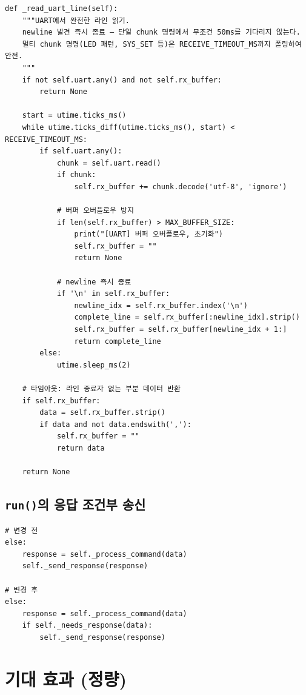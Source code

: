 \documentclass[11pt, oneside]{article}
\begin{document}
\begin{verbatim}
def _read_uart_line(self):
    """UART에서 완전한 라인 읽기.
    newline 발견 즉시 종료 — 단일 chunk 명령에서 무조건 50ms를 기다리지 않는다.
    멀티 chunk 명령(LED 패턴, SYS_SET 등)은 RECEIVE_TIMEOUT_MS까지 폴링하여 안전.
    """
    if not self.uart.any() and not self.rx_buffer:
        return None

    start = utime.ticks_ms()
    while utime.ticks_diff(utime.ticks_ms(), start) < RECEIVE_TIMEOUT_MS:
        if self.uart.any():
            chunk = self.uart.read()
            if chunk:
                self.rx_buffer += chunk.decode('utf-8', 'ignore')

            # 버퍼 오버플로우 방지
            if len(self.rx_buffer) > MAX_BUFFER_SIZE:
                print("[UART] 버퍼 오버플로우, 초기화")
                self.rx_buffer = ""
                return None

            # newline 즉시 종료
            if '\n' in self.rx_buffer:
                newline_idx = self.rx_buffer.index('\n')
                complete_line = self.rx_buffer[:newline_idx].strip()
                self.rx_buffer = self.rx_buffer[newline_idx + 1:]
                return complete_line
        else:
            utime.sleep_ms(2)

    # 타임아웃: 라인 종료자 없는 부분 데이터 반환
    if self.rx_buffer:
        data = self.rx_buffer.strip()
        if data and not data.endswith(','):
            self.rx_buffer = ""
            return data

    return None
\end{verbatim}

\subsection{\texttt{run()}의 응답 조건부 송신}

\begin{verbatim}
# 변경 전
else:
    response = self._process_command(data)
    self._send_response(response)

# 변경 후
else:
    response = self._process_command(data)
    if self._needs_response(data):
        self._send_response(response)
\end{verbatim}

\section{기대 효과 (정량)}
\end{document}
